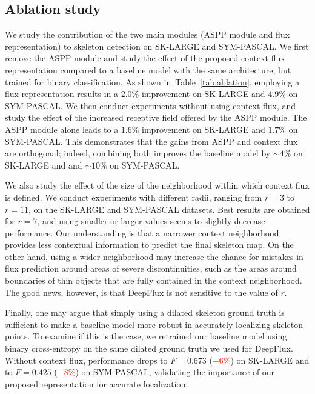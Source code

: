\documentclass[10pt,twocolumn,letterpaper]{article}
\newcommand{\reftab}[1]{Table~\ref{#1}}
\begin{document}
\subsection{Ablation study} \label{sec:ablation}
We study the contribution of the two main modules (ASPP module and flux representation)  to skeleton detection on SK-LARGE and SYM-PASCAL. We first remove the ASPP module and study the effect of the proposed context flux representation compared to a baseline model with the same architecture, but trained for binary classification.
As shown in~\reftab{tab:ablation}, employing a flux representation results in a $2.0\%$  improvement on SK-LARGE and $4.9\%$ on SYM-PASCAL.
We then conduct experiments without using context flux, and study the effect of the increased receptive field offered by the ASPP module.
The ASPP module alone leads to a $1.6\%$ improvement on SK-LARGE and $1.7\%$ on SYM-PASCAL.
This demonstrates that the gains from ASPP and context flux are orthogonal; indeed, combining both improves the baseline model by $\sim4\%$ on SK-LARGE and and $\sim10\%$  on SYM-PASCAL.

We also study the effect of the size of the neighborhood within which context flux is defined.
We conduct experiments with different radii, ranging from $r=3$ to $r=11$, on the SK-LARGE and SYM-PASCAL datasets.
Best results are obtained for $r=7$, and using smaller or larger values seems to slightly decrease performance.
Our understanding is that a narrower context neighborhood provides less contextual information to predict the final skeleton map.
On the other hand, using a wider neighborhood may increase the chance for mistakes in flux prediction around areas of severe discontinuities, such as the areas around boundaries of thin objects that are fully contained in the context neighborhood.
The good news, however, is that DeepFlux is not sensitive to the value of $r$.

Finally, one may argue that simply using a dilated skeleton ground truth is sufficient to make a baseline model more robust in accurately localizing skeleton points.
To examine if this is the case, we retrained our baseline model using binary cross-entropy on the same dilated ground truth we used for DeepFlux.
Without context flux, performance drops to $F=0.673$ (\textcolor{red}{$-6\%$}) on SK-LARGE and to $F=0.425$ (\textcolor{red}{$-8\%$}) on SYM-PASCAL, validating the importance of our proposed representation for accurate localization.
\end{document}
